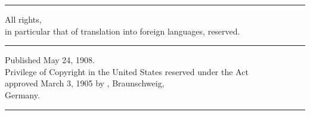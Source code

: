 \vspace*{0.3\textheight}
\begin{center}
\rule{\linewidth}{0.4pt}

\vspace{1.5em}
All rights,\\
in particular that of translation into foreign languages, reserved.

\vspace{1em}
\rule{3cm}{0.4pt}

\vspace{1em}
Published May 24, 1908.\\
Privilege of Copyright in the United States reserved under the Act\\
approved March 3, 1905 by , Braunschweig,\\
Germany.

\vspace{1.5em}
\rule{\linewidth}{0.4pt}
\end{center}
